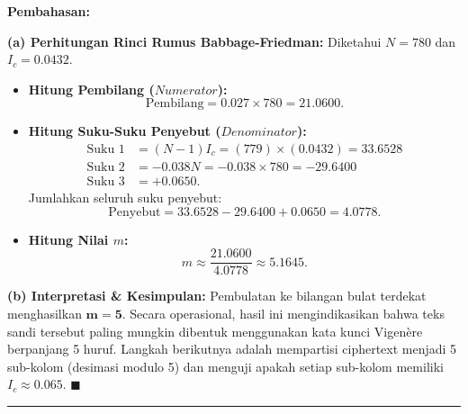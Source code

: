\documentclass[11pt,a4paper]{article}
\newenvironment{solusi}{\noindent\textbf{\textsf{Pembahasan:}}\par\vspace{0.2em}}{\hfill$\blacksquare$\vspace{1em}\par\hrule\vspace{1em}}
\begin{document}
\begin{solusi}
\textbf{(a) Perhitungan Rinci Rumus Babbage-Friedman:}
Diketahui $N = 780$ dan $I_c = 0.0432$.
\begin{itemize}[leftmargin=*]
    \item \textbf{Hitung Pembilang ($Numerator$):}
    \[
    \text{Pembilang} = 0.027 \times 780 = \mathbf{21.0600}.
    \]
    \item \textbf{Hitung Suku-Suku Penyebut ($Denominator$):}
    \begin{align*}
    \text{Suku 1} &= (N - 1) I_c = (779) \times (0.0432) = 33.6528 \\
    \text{Suku 2} &= -0.038 N = -0.038 \times 780 = -29.6400 \\
    \text{Suku 3} &= +0.0650.
    \end{align*}
    Jumlahkan seluruh suku penyebut:
    \[
    \text{Penyebut} = 33.6528 - 29.6400 + 0.0650 = \mathbf{4.0778}.
    \]
    \item \textbf{Hitung Nilai $m$:}
    \[
    m \approx \frac{21.0600}{4.0778} \approx \mathbf{5.1645}.
    \]
\end{itemize}

\vspace{0.2cm}
\textbf{(b) Interpretasi \& Kesimpulan:}
Pembulatan ke bilangan bulat terdekat menghasilkan $\mathbf{m = 5}$.
Secara operasional, hasil ini mengindikasikan bahwa teks sandi tersebut paling mungkin dibentuk menggunakan kata kunci Vigenère berpanjang 5 huruf. Langkah berikutnya adalah mempartisi ciphertext menjadi 5 sub-kolom (desimasi modulo 5) dan menguji apakah setiap sub-kolom memiliki $I_c \approx 0.065$.
\end{solusi}

\end{document}
